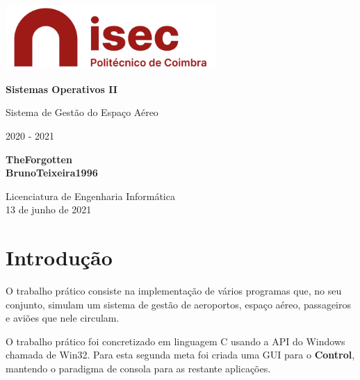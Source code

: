 \documentclass[11pt]{article}
\begin{document}
	\begin{titlepage}
    	\begin{center}
    		\includegraphics[width=0.6\textwidth]{logo-isec}
    		
    		\vspace*{\fill}
    		
    		\Huge
    		\textbf{Sistemas Operativos II}
    		
    		\huge
    		Sistema de Gestão do Espaço Aéreo
    		
    		\vspace{0.5cm}
    		\LARGE
    		2020 - 2021
    		
    		\vspace{1.5cm}
    		
    		\textbf{TheForgotten\\BrunoTeixeira1996}
    		
    		\vfill
    		\vspace*{\fill}
    		
    		\normalsize
    		Licenciatura de Engenharia Informática \\
    		13 de junho de 2021		
    	\end{center}
    \end{titlepage}
	
	\tableofcontents
	\pagebreak
	
	\large
	\section{Introdução}
	\normalsize
	
	O trabalho prático consiste na implementação de vários programas que, no seu conjunto, simulam um sistema de gestão de aeroportos, espaço aéreo, passageiros e aviões que nele circulam.
	
	O trabalho prático foi concretizado em linguagem C usando a API do Windows chamada de Win32. Para esta segunda meta foi criada uma GUI para o \textbf{Control}, mantendo o paradigma de consola para as restante aplicações.
	
\end{document}
